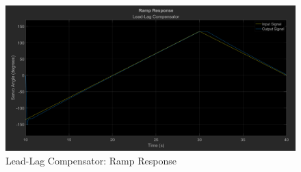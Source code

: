 \documentclass[12pt]{article}
\begin{document}
\begin{figure}[h!]
    \centering
    \includegraphics[width=\textwidth]{ramp_leadlag}
    \caption{\label{fig:ramp_leadlag}Lead-Lag Compensator: Ramp Response}
\end{figure}
\end{document}
